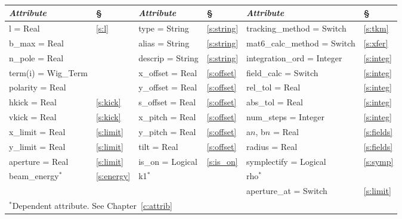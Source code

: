 {{\begin{center}
\tt
\begin{tabular}{|l|l||l|l||l|l|} \hline
  {\sl Attribute} & \S  & {\sl Attribute} & \S & {\sl Attribute} & \S \\ \hline
  l        = Real       & \ref{s:l}      & type = String      & \ref{s:string} & tracking\_method = Switch   & \ref{s:tkm}   \\ \hline
  b\_max   = Real       &                & alias = String     & \ref{s:string} & mat6\_calc\_method = Switch & \ref{s:xfer}  \\ \hline
  n\_pole  = Real       &                & descrip = String   & \ref{s:string} & integration\_ord = Integer  & \ref{s:integ} \\ \hline
  term(i) = Wig\_Term   &                & x\_offset  = Real  & \ref{s:offset} & field\_calc = Switch        & \ref{s:integ} \\ \hline
  polarity = Real       &                & y\_offset  = Real  & \ref{s:offset} & rel\_tol = Real             & \ref{s:integ} \\ \hline
  hkick    = Real       & \ref{s:kick}   & s\_offset  = Real  & \ref{s:offset} & abs\_tol = Real             & \ref{s:integ} \\ \hline
  vkick    = Real       & \ref{s:kick}   & x\_pitch = Real    & \ref{s:offset} & num\_steps = Integer        & \ref{s:integ} \\ \hline
  x\_limit = Real       & \ref{s:limit}  & y\_pitch = Real    & \ref{s:offset} & a$n$, b$n$ = Real           & \ref{s:fields}\\ \hline
  y\_limit = Real       & \ref{s:limit}  & tilt     = Real    & \ref{s:offset} & radius  = Real              & \ref{s:fields}\\ \hline
  aperture = Real       & \ref{s:limit}  & is\_on = Logical   & \ref{s:is_on}  & symplectify = Logical       & \ref{s:symp}  \\ \hline
  beam\_energy$^*$      & \ref{s:energy} & k1$^*$             &                & rho$^*$                     &               \\ \hline
                        &                &                    &                & aperture\_at = Switch       & \ref{s:limit} \\ \hline
  \multicolumn{6}{l}{\small $^*$Dependent attribute. See Chapter~\ref{c:attrib}} \\
\end{tabular}
\end{center}
\toffset

}}
